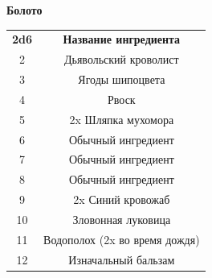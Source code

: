 \documentclass[a4paper, 9pt, twocolumn]{book}
\begin{document}
	\begin{table}[H]
		
		{\Large \textbf{Болото}}
		
		\medspace 
		
		\centering 
		
		\begin{tabularx}{\linewidth}{c C}
			
			\textbf{2d6} & \textbf{Название ингредиента} \\
			
			2 & Дьявольский кроволист \\
			
			3 & Ягоды шипоцвета \\
			
			4 & Рвоск \\
			
			5 & 2x Шляпка мухомора \\
			
			6 & Обычный ингредиент \\
			
			7 & Обычный ингредиент \\
			
			8 & Обычный ингредиент \\
			
			9 & 2x Синий кровожаб \\
			
			10 & Зловонная луковица \\
			
			11 & Водополох (2x во время дождя)\\
			
			12 & Изначальный бальзам
		\end{tabularx}
	\end{table}

	\newpage
\end{document}
